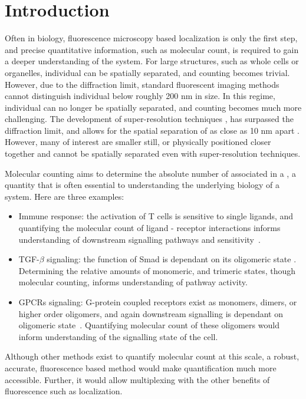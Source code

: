 \section{Introduction}

Often in biology, fluorescence microscopy based localization is only the first step, and precise quantitative information, 
  such as molecular count, is required to gain a deeper understanding of the system.
  For large structures, such as whole cells or organelles, individual \objects can be spatially separated, 
  and counting becomes trivial.
  However, due to the diffraction limit, standard fluorescent imaging methods cannot distinguish individual \objects 
  below roughly 200 nm in size. 
  In this regime, individual \objects can no longer be spatially separated, and counting becomes much more challenging. 
  The development of super-resolution techniques \cite{betzig_2006, rust_2006}, has surpassed the diffraction limit, and allows
  for the spatial separation of \objects as close as 10 nm apart \cite{valli_seeing_2021}.
  However, many \objects of interest are smaller still, or physically positioned closer 
  together and cannot be spatially separated even with super-resolution techniques.

Molecular counting aims to determine the absolute number of \smallobjects
  associated in a \object, a quantity that is often essential to understanding the
  underlying biology of a system. 
  Here are three examples:
  \begin{itemize}
  
    \item Immune response: the activation of T cells is sensitive to single ligands, and quantifying 
      the molecular count of ligand - receptor interactions informs understanding of downstream signalling pathways and sensitivity~\cite{irvine_2002}.

    \item TGF-$\beta$ signaling: the function of Smad is dependant on its oligomeric state \cite{inman_2002, moustakas_2002}. Determining the relative 
      amounts of monomeric, and trimeric states, though molecular counting, informs understanding of pathway activity.

    \item GPCRs signaling: G-protein coupled receptors exist as monomers, dimers, or higher order oligomers, 
      and again downstream signalling is dependant on oligomeric state~\cite{felce_2018, breitwieser_2004}.
      Quantifying molecular count of these oligomers would inform understanding of the signalling state of the cell.

    \end{itemize}
    Although other methods exist to quantify molecular count at this scale, a robust, accurate,
    fluorescence based method would make quantification much more accessible. Further, it would 
    allow multiplexing with the other benefits of fluorescence such as localization. 

